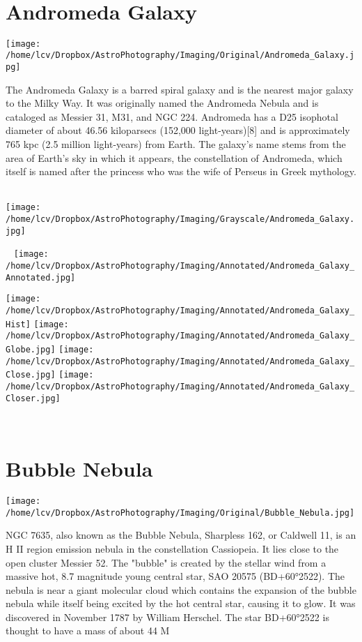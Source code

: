 \newpage\pagecolor{black}\color{white}
\ \\\section{Andromeda Galaxy}
\texttt{[image: /home/lcv/Dropbox/AstroPhotography/Imaging/Original/Andromeda\_Galaxy.jpg]}
{\footnotesize\color{white}
The Andromeda Galaxy is a barred spiral galaxy and is the nearest major galaxy to the Milky Way. It was originally named the Andromeda Nebula and is cataloged as Messier 31, M31, and NGC 224. Andromeda has a D25 isophotal diameter of about 46.56 kiloparsecs (152,000 light-years)[8] and is approximately 765 kpc (2.5 million light-years) from Earth. The galaxy's name stems from the area of Earth's sky in which it appears, the constellation of Andromeda, which itself is named after the princess who was the wife of Perseus in Greek mythology. 


}\ \\
\texttt{[image: /home/lcv/Dropbox/AstroPhotography/Imaging/Grayscale/Andromeda\_Galaxy.jpg]}
\begin{center}
 \ \newpage
\texttt{[image: /home/lcv/Dropbox/AstroPhotography/Imaging/Annotated/Andromeda\_Galaxy\_Annotated.jpg]}

\texttt{[image: /home/lcv/Dropbox/AstroPhotography/Imaging/Annotated/Andromeda\_Galaxy\_Hist]}
\texttt{[image: /home/lcv/Dropbox/AstroPhotography/Imaging/Annotated/Andromeda\_Galaxy\_Globe.jpg]}
\texttt{[image: /home/lcv/Dropbox/AstroPhotography/Imaging/Annotated/Andromeda\_Galaxy\_Close.jpg]}
\texttt{[image: /home/lcv/Dropbox/AstroPhotography/Imaging/Annotated/Andromeda\_Galaxy\_Closer.jpg]}
\end{center}
\ \\\section{Bubble Nebula}
\texttt{[image: /home/lcv/Dropbox/AstroPhotography/Imaging/Original/Bubble\_Nebula.jpg]}
{\footnotesize\color{white}
NGC 7635, also known as the Bubble Nebula, Sharpless 162, or Caldwell 11, is an H II region emission nebula in the constellation Cassiopeia. It lies close to the open cluster Messier 52. The "bubble" is created by the stellar wind from a massive hot, 8.7 magnitude young central star, SAO 20575 (BD+60°2522). The nebula is near a giant molecular cloud which contains the expansion of the bubble nebula while itself being excited by the hot central star, causing it to glow. It was discovered in November 1787 by William Herschel. The star BD+60°2522 is thought to have a mass of about 44 M


}\ \\
